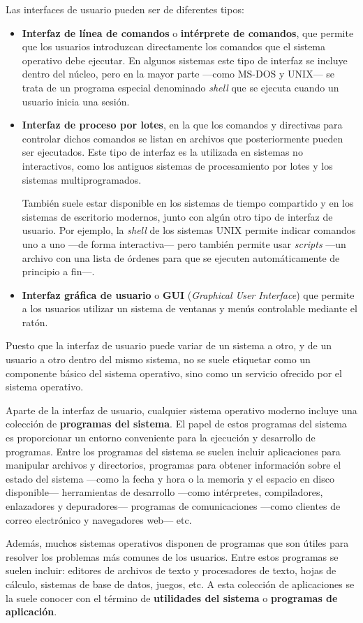 Las interfaces de usuario pueden ser de diferentes tipos:

\begin{itemize}
\item
  \textbf{Interfaz de línea de comandos}{} o \textbf{{}intérprete de
  comandos}, que permite que los usuarios introduzcan directamente los
  comandos que el sistema operativo debe ejecutar. En algunos sistemas
  este tipo de interfaz se incluye dentro del núcleo, pero en la mayor
  parte ---como MS-DOS y UNIX--- se trata de un programa especial
  denominado \emph{shell} que se ejecuta cuando un usuario inicia una
  sesión.
\item
  \textbf{Interfaz de proceso por lotes}{}, en la que los comandos y
  directivas para controlar dichos comandos se listan en archivos que
  posteriormente pueden ser ejecutados. Este tipo de interfaz es la
  utilizada en sistemas no interactivos, como los antiguos sistemas de
  procesamiento por lotes y los sistemas multiprogramados.

  También suele estar disponible en los sistemas de tiempo compartido y
  en los sistemas de escritorio modernos, junto con algún otro tipo de
  interfaz de usuario. Por ejemplo, la \emph{shell} de los sistemas UNIX
  permite indicar comandos uno a uno ---de forma interactiva--- pero
  también permite usar \emph{scripts} ---un archivo con una lista de
  órdenes para que se ejecuten automáticamente de principio a fin---.
\item
  \textbf{Interfaz gráfica de usuario}{} o \textbf{{}GUI}
  (\emph{Graphical User Interface}) que permite a los usuarios utilizar
  un sistema de ventanas y menús controlable mediante el ratón.
\end{itemize}

Puesto que la interfaz de usuario puede variar de un sistema a otro, y
de un usuario a otro dentro del mismo sistema, no se suele etiquetar
como un componente básico del sistema operativo, sino como un servicio
ofrecido por el sistema operativo.

Aparte de la interfaz de usuario, cualquier sistema operativo moderno
incluye una colección de \textbf{programas del sistema}{}. El papel de
estos programas del sistema es proporcionar un entorno conveniente para
la ejecución y desarrollo de programas. Entre los programas del sistema
se suelen incluir aplicaciones para manipular archivos y directorios,
programas para obtener información sobre el estado del sistema ---como
la fecha y hora o la memoria y el espacio en disco disponible---
herramientas de desarrollo ---como intérpretes, compiladores,
enlazadores y depuradores--- programas de comunicaciones ---como
clientes de correo electrónico y navegadores web--- etc.

Además, muchos sistemas operativos disponen de programas que son útiles
para resolver los problemas más comunes de los usuarios. Entre estos
programas se suelen incluir: editores de archivos de texto y
procesadores de texto, hojas de cálculo, sistemas de base de datos,
juegos, etc. A esta colección de aplicaciones se la suele conocer con el
término de \textbf{{}utilidades del sistema} o \textbf{programas de
aplicación}{}.
